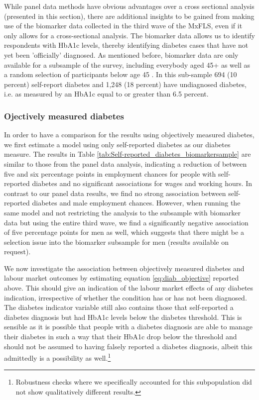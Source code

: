 \documentclass[12pt,english,british]{article}
\begin{document}
While panel data methods have obvious advantages over a cross sectional
analysis (presented in this section), there are additional insights
to be gained from making use of the biomarker data collected in the
third wave of the \ac{MxFLS}, even if it only allows for a cross-sectional
analysis. The biomarker data allows us to identify respondents with
\ac{HbA1c} levels, thereby identifying diabetes cases that have
not yet been 'officially' diagnosed. As mentioned before, biomarker
data are only available for a subsample of the survey, including everybody
aged 45+ as well as a random selection of participants below age 45
\citep{Crimmins2015}. In this sub-sample 694 (10 percent) self-report
diabetes and 1,248 (18 percent) have undiagnosed diabetes, i.e. as
measured by an \ac{HbA1c} equal to or greater than 6.5 percent.

  
  

\subsubsection*{Ojectively measured diabetes}

In order to have a comparison for the results using objectively measured
diabetes, we first estimate a model using only self-reported diabetes as our diabetes measure.
The results in Table \ref{tab:Self-reported_diabetes_biomarkersample}
are similar to those from the panel data analysis, indicating a reduction
of between five and six percentage points in employment chances for
people with self-reported diabetes and no significant associations
for wages and working hours. In contrast to our panel data results,
we find no strong association between self-reported diabetes and male
employment chances. However, when running the same model and not restricting the analysis to the subsample with biomarker data but using the
entire third wave, we find a significantly negative association of
five percentage points for men as well, which suggests that there
might be a selection issue into the biomarker subsample for men (results available on request).

We now investigate the association between objectively measured
diabetes and labour market outcomes by estimating equation \ref{eq:diab_objective}
reported above. This should give an indication of the labour
market effects of any diabetes indication, irrespective of whether
the condition has or has not been diagnosed. The diabetes indicator
variable still also contains those that self-reported a diabetes diagnosis
but had \ac{HbA1c} levels below the diabetes threshold. This is sensible as it is possible that people with a diabetes diagnosis are able to manage their diabetes in such a way that their \ac{HbA1c} drop below the threshold and should not be assumed to having falsely reported a diabetes diagnosis, albeit this admittedly is a possibility as well.\footnote{Robustness checks where we specifically accounted for this subpopulation
did not show qualitatively different results.} 
\end{document}
